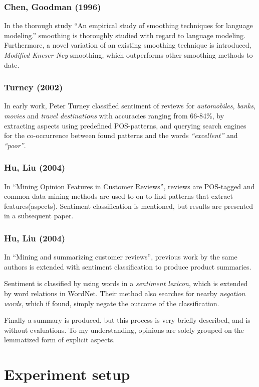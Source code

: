 \documentclass[a4paper,11pt]{kth-mag}
\begin{document}
\subsubsection{Chen, Goodman (1996)}
In the thorough study ``An empirical study of smoothing techniques for language modeling.'' smoothing is
thoroughly studied with regard to language modeling. Furthermore, a novel variation of an existing
smoothing technique is introduced, \emph{Modified Kneser-Ney}-smoothing, which outperforms other
smoothing methods to date.


\subsubsection{Turney (2002)}
In early work, Peter Turney classified sentiment of reviews for \emph{automobiles}, \emph{banks}, \emph{movies} and \emph{travel destinations} with accuracies ranging from 66-84\%, by extracting aspects using predefined POS-patterns, and querying search engines for the co-occurrence between found patterns and the words \emph{``excellent''} and \emph{``poor''}\cite{turney2002thumbs}.

\subsubsection{Hu, Liu (2004)}
In ``Mining Opinion Features in Customer Reviews'', reviews are POS-tagged and common data mining methods are used to on to find patterns that extract features(aspects). Sentiment classification is mentioned, but results are presented in a subsequent paper.

\subsubsection{Hu, Liu (2004)}
In ``Mining and summarizing customer reviews'',
previous work by the same authors is extended
with sentiment classification to produce product summaries.

Sentiment is classified by using words in a \emph{sentiment lexicon},
which is extended by word relations in WordNet. Their method also searches for nearby
\emph{negation words}, which if found,
simply negate the outcome of the classification.

Finally a summary is produced, but this process is very briefly described, and is without evaluations. To my understanding, opinions are solely grouped on the lemmatized form of explicit aspects.


\pagebreak
\section{Experiment setup}
\end{document}
